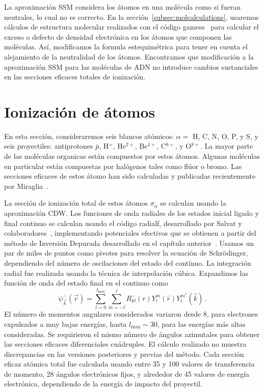 La aproximación SSM considera los átomos en una molécula como si fueran
neutrales, lo cual no es correcto. En la sección~\ref{subsec:molcalculations}, 
usaremos cálculos de estructura molecular realizados con el código
{\sc gamess}~\cite{gamess} para calcular el exceso o defecto de densidad 
electrónica en los átomos que componen las moléculas. Así, modificamos
la formula estequimétrica para tener en cuenta el alejamiento de la 
neutralidad de los átomos. Encontramos que modificación a la aproximación 
SSM para las moléculas de ADN no introduce cambios sustanciales en las 
secciones eficaces totales de ionización.

\section{Ionización de átomos}
\label{sec:atoms}

En esta sección, consideraremos seis blancos atómicos: $\alpha=$ H, C, 
N, O, P, y S, y seis proyectiles: antiprotones $\bar{p}$, H$^{+}$, 
He$^{2+}$, Be$^{4+}$, C$^{6+}$, y O$^{8+}$. La mayor parte de las 
moléculas organicas están compuestos por estos átomos. Algunas moléculas
en particular están compuestas por halógenos tales como flúor o bromo.
Las secciones eficaces de estos átomo han sido calculadas y publicadas
recientemente por Miraglia~\cite{miraglia2008}.

La sección de ionización total de estos átomos $\sigma_{\alpha}$ se
calculan usando la aproximación CDW. Los funciones de onda radiales
de los estados inicial ligado y final continuo se calculan usando el
código {\sc radialf}, desarrollado por Salvat y 
colaboradores~\cite{salvat1995}, implementando potenciales efectivos que
se obtienen a partir del método de Inversión Depurada desarrollado en el
capítulo anterior~\cite{Mendez:16,Mendez:18}. Usamos un par de miles
de puntos como pivotes para resolver la ecuación de Schr\"{o}dinger,
dependiendo del número de oscilaciones del estado del contínuo. 
La integración radial fue realizada usando la técnica de interpolación
cúbica. Expandimos las función de onda del estado final en el continuo
como
\begin{equation}
\psi_{\overrightarrow{k}}^{-}(\overrightarrow{r})=\sum_{l=0}^{l_{\max
}}\sum_{m=-l}^{l}R_{kl}^{-}(r)Y_{l}^{m}(\widehat{r})Y_{l}^{m^{\ast }}
(\widehat{k})\,.
\label{eq:contwave}
\end{equation}
El número de momentos angulares considerados variaron desde 8, para 
electrones expulsados a muy bajas energías, hasta $l_{\max}\sim 30$, 
para las energías más altas consideradas. Se requirieron el mismo 
número de ángulos azimutales para obtener las secciones eficaces 
diferenciales cuádruples. El cálculo realizado no muestra discrepancias 
en las versiones posteriores y previas del método. Cada sección eficaz
atómica total fue calculada usando entre 35 y 100 valores de 
transferencia de momento, 28 ángulos electrónicos fijos, y alrededor
de 45 valores de energía electrónica, dependiendo de la energía de 
impacto del proyectil. 

